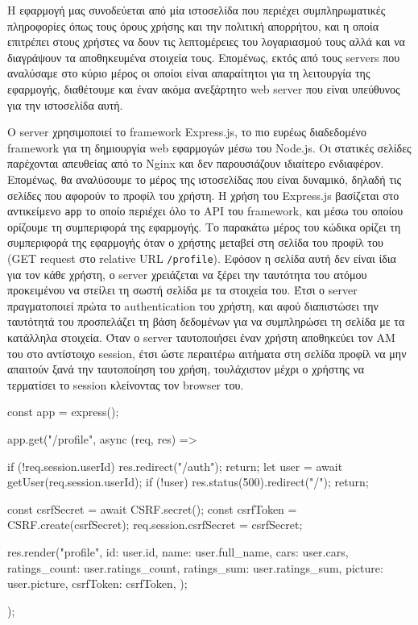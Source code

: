 \documentclass[../thesis.tex]{subfiles}
\begin{document}
Η εφαρμογή μας συνοδεύεται από μία ιστοσελίδα που περιέχει συμπληρωματικές πληροφορίες όπως τους όρους χρήσης και την πολιτική απορρήτου, και η οποία επιτρέπει στους χρήστες να δουν τις λεπτομέρειες του λογαριασμού τους αλλά και να διαγράψουν τα αποθηκευμένα στοιχεία τους.
Επομένως, εκτός από τους servers που αναλύσαμε στο κύριο μέρος οι οποίοι είναι απαραίτητοι για τη λειτουργία της εφαρμογής, διαθέτουμε και έναν ακόμα ανεξάρτητο web server που είναι υπεύθυνος για την ιστοσελίδα αυτή.

Ο server χρησιμοποιεί το framework Express.js, το πιο ευρέως διαδεδομένο framework για τη δημιουργία web εφαρμογών μέσω του Node.js.
Οι στατικές σελίδες παρέχονται απευθείας από το Nginx και δεν παρουσιάζουν ιδιαίτερο ενδιαφέρον.
Επομένως, θα αναλύσουμε το μέρος της ιστοσελίδας που είναι δυναμικό, δηλαδή τις σελίδες που αφορούν το προφίλ του χρήστη.
Η χρήση του Express.js βασίζεται στο αντικείμενο \verb|app| το οποίο περιέχει όλο το API του framework, και μέσω του οποίου ορίζουμε τη συμπεριφορά της εφαρμογής.
Το παρακάτω μέρος του κώδικα ορίζει τη συμπεριφορά της εφαρμογής όταν ο χρήστης μεταβεί στη σελίδα του προφίλ του (GET request στο relative URL \verb|/profile|).
Εφόσον η σελίδα αυτή δεν είναι ίδια για τον κάθε χρήστη, ο server χρειάζεται να ξέρει την ταυτότητα του ατόμου προκειμένου να στείλει τη σωστή σελίδα με τα στοιχεία του.
Έτσι ο server πραγματοποιεί πρώτα το authentication του χρήστη, και αφού διαπιστώσει την ταυτότητά του προσπελάζει τη βάση δεδομένων για να συμπληρώσει τη σελίδα με τα κατάλληλα στοιχεία.
Όταν ο server ταυτοποιήσει έναν χρήστη αποθηκεύει τον ΑΜ του στο αντίστοιχο session, έτσι ώστε περαιτέρω αιτήματα στη σελίδα προφίλ να μην απαιτούν ξανά την ταυτοποίηση του χρήση, τουλάχιστον μέχρι ο χρήστης να τερματίσει το session κλείνοντας τον browser του.

\begin{codeblock}
  const app = express();

  app.get("/profile", async (req, res) => {
    if (!req.session.userId) {
      res.redirect("/auth");
      return;
    }
    let user = await getUser(req.session.userId);
    if (!user) {
      res.status(500).redirect("/");
      return;
    }

    const csrfSecret = await CSRF.secret();
    const csrfToken = CSRF.create(csrfSecret);
    req.session.csrfSecret = csrfSecret;

    res.render("profile", {
      id: user.id,
      name: user.full_name,
      cars: user.cars,
      ratings_count: user.ratings_count,
      ratings_sum: user.ratings_sum,
      picture: user.picture,
      csrfToken: csrfToken,
    });
  });
\end{codeblock}
\end{document}
